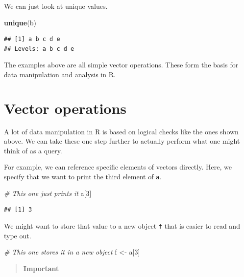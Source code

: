\documentclass[
]{book}
\newenvironment{Shaded}{\begin{snugshade}}{\end{snugshade}}
\newcommand{\CommentTok}[1]{\textcolor[rgb]{0.56,0.35,0.01}{\textit{#1}}}
\newcommand{\DecValTok}[1]{\textcolor[rgb]{0.00,0.00,0.81}{#1}}
\newcommand{\KeywordTok}[1]{\textcolor[rgb]{0.13,0.29,0.53}{\textbf{#1}}}
\newcommand{\NormalTok}[1]{#1}
\newcommand{\StringTok}[1]{\textcolor[rgb]{0.31,0.60,0.02}{#1}}
\begin{document}
We can just look at unique values.

\begin{Shaded}
\begin{Highlighting}[]
\KeywordTok{unique}\NormalTok{(b)}
\end{Highlighting}
\end{Shaded}

\begin{verbatim}
## [1] a b c d e
## Levels: a b c d e
\end{verbatim}

The examples above are all simple vector operations. These form the basis for data manipulation and analysis in R.

\hypertarget{operations}{%
\section{Vector operations}\label{operations}}

A lot of data manipulation in R is based on logical checks like the ones shown above. We can take these one step further to actually perform what one might think of as a query.

For example, we can reference specific elements of vectors directly. Here, we specify that we want to print the third element of \texttt{a}.

\begin{Shaded}
\begin{Highlighting}[]
\CommentTok{# This one just prints it}
\NormalTok{a[}\DecValTok{3}\NormalTok{]}
\end{Highlighting}
\end{Shaded}

\begin{verbatim}
## [1] 3
\end{verbatim}

We might want to store that value to a new object \texttt{f} that is easier to read and type out.

\begin{Shaded}
\begin{Highlighting}[]
\CommentTok{# This one stores it in a new object}
\NormalTok{f <-}\StringTok{ }\NormalTok{a[}\DecValTok{3}\NormalTok{]}
\end{Highlighting}
\end{Shaded}

\begin{quote}
\textbf{Important}
\end{quote}
\end{document}
